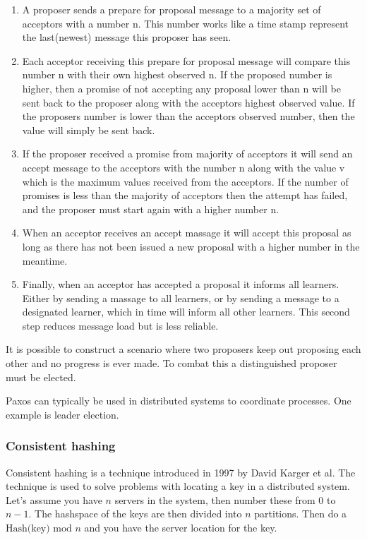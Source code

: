 \begin{enumerate}

\item A proposer sends a prepare for proposal message to a majority set of acceptors with a number n. This number works like a time stamp represent the last(newest) message this proposer has seen. 
\item Each acceptor receiving this prepare for proposal message will compare this number n with their own highest observed n. If the proposed number is higher, then a promise of not accepting any proposal lower than n will be sent back to the proposer along with the acceptors highest observed value. If the proposers number is lower than the acceptors observed number, then the value will simply be sent back. 
\item If the proposer received a promise from majority of acceptors it will send an accept message to the acceptors with the number n along with the value v which is the maximum values received from the acceptors. If the number of promises is less than the majority of acceptors then the attempt has failed, and the proposer must start again with a higher number n.
\item When an acceptor receives an accept massage it will accept this proposal as long as there has not been issued a new proposal with a higher number in the meantime. 
\item Finally, when an acceptor has accepted a proposal it informs all learners. Either by sending a massage to all learners, or by sending a message to a designated learner, which in time will inform all other learners. This second step reduces message load but is less reliable.

\end{enumerate}

It is possible to construct a scenario where two proposers keep out proposing each other and no progress is ever made. To combat this a distinguished proposer must be elected. 

Paxos can typically be used in distributed systems to coordinate processes. One example is leader election.




\subsubsection{Consistent hashing}
\label{sec:consistenthashing}
Consistent hashing is a technique introduced in 1997 by David Karger et al.\cite{Karger97consistenthashing}
The technique is used to solve problems with locating a key in a distributed system.
Let's assume you have $n$ servers in the system, then number these from $0$ to $n-1$.
The hashspace of the keys are then divided into $n$ partitions. Then do a $\textrm{Hash(key) mod } n$ and you have the server location for the key.

